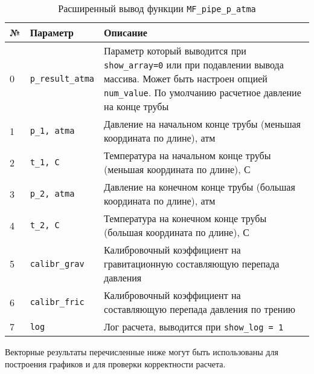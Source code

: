 \begin{table}[H]
	\caption{Расширенный вывод функции \texttt{MF_pipe_p_atma} }
	\label{table:res_list_pipe}
	\begin{tabular}{p{}p{}p{}}
		\hline
		№& Параметр & Описание  \\ \hline
		0 & \texttt{p_result_atma} & Параметр который выводится при \texttt{show_array=0} или при подавлении вывода массива. Может быть настроен опцией  \texttt{num_value}. По умолчанию расчетное давление на конце трубы    \\ \hline
		
		1 & \texttt{p_1, atma} & Давление на начальном конце трубы (меньшая координата по длине), атм    \\ \hline
		2 & \texttt{t_1, C} &   Температура на начальном конце трубы (меньшая координата по длине), С    \\ \hline
		3 & \texttt{p_2, atma} & Давление на конечном конце трубы (большая координата по длине), атм     \\ \hline
		4 & \texttt{t_2, C} & Температура на конечном конце трубы (большая координата по длине), С     \\ \hline
		5 & \texttt{calibr_grav} & Калибровочный коэффициент на гравитационную составляющую перепада давления   \\ \hline
		6 & \texttt{calibr_fric} &  Калибровочный коэффициент на составляющую перепада давления по трению  \\ \hline
		7 & \texttt{log} & Лог расчета, выводится при \texttt{show_log = 1}  \\ \hline
			
	\end{tabular}
\end{table}

Векторные результаты перечисленные ниже могут быть использованы для построения графиков и для проверки корректности расчета.

